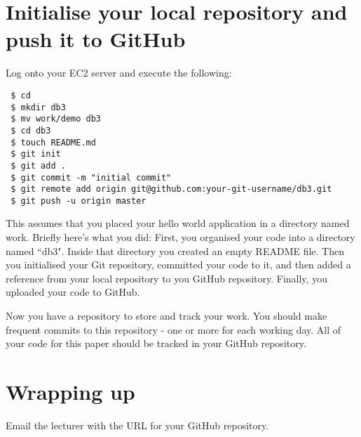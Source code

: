 \documentclass{article}
\begin{document}
\section{Initialise your local repository and push it to GitHub}
Log onto your EC2 server and execute the following:

\begin{verbatim}
 $ cd
 $ mkdir db3
 $ mv work/demo db3
 $ cd db3
 $ touch README.md
 $ git init
 $ git add .
 $ git commit -m "initial commit"
 $ git remote add origin git@github.com:your-git-username/db3.git
 $ git push -u origin master
\end{verbatim}

This assumes that you placed your hello world application in a directory named work.  Briefly here's what you did:  First, you organised your code into a directory named ``db3".  Inside that directory you created an empty README file.  Then you initialised your Git repository, committed your code to it, and then added a reference from your local repository to you GitHub repository.  Finally, you uploaded your code to GitHub.

Now you have a repository to store and track your work.  You should make frequent commits to this repository - one or more for each working day.  All of your code for this paper should be tracked in your GitHub repository.

\section{Wrapping up}
Email the lecturer with the URL for your GitHub repository.
\end{document}
